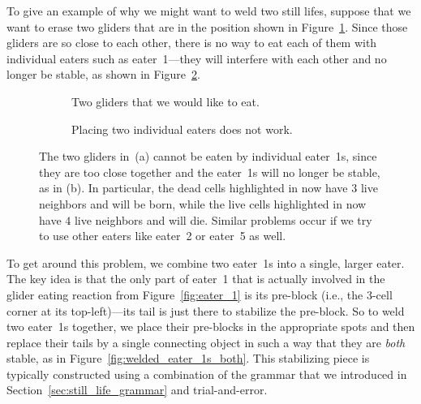 To give an example of why we might want to weld two still lifes, suppose that we want to erase two gliders that are in the position shown in Figure~\ref{fig:unstable_eater_1s_a}. Since those gliders are so close to each other, there is no way to eat each of them with individual eaters such as eater~1---they will interfere with each other and no longer be stable, as shown in Figure~\ref{fig:unstable_eater_1s_b}.

\begin{figure}[!htb]
	\centering
	\begin{subfigure}{.47\textwidth}
		\centering
		\caption{Two gliders that we would like to eat.}
		\label{fig:unstable_eater_1s_a}
	\end{subfigure} \quad %
	\begin{subfigure}{.47\textwidth}
		\centering
		\caption{Placing two individual eaters does not work.}
		\label{fig:unstable_eater_1s_b}
	\end{subfigure}
	\caption{The two gliders in~(a) cannot be eaten by individual eater~1s, since they are too close together and the eater~1s will no longer be stable, as in (b). In particular, the dead cells highlighted in  now have $3$ live neighbors and will be born, while the live cells highlighted in  now have $4$ live neighbors and will die. Similar problems occur if we try to use other eaters like eater~2 or eater~5 as well.}\label{fig:unstable_eater_1s}
\end{figure}

To get around this problem, we combine two eater~1s into a single, larger eater. The key idea is that the only part of eater~1 that is actually involved in the glider eating reaction from Figure~\ref{fig:eater_1} is its pre-block (i.e., the $3$-cell corner at its top-left)---its tail is just there to stabilize the pre-block. So to weld two eater~1s together, we place their pre-blocks in the appropriate spots and then replace their tails by a single connecting object in such a way that they are \emph{both} stable, as in Figure~\ref{fig:welded_eater_1s_both}. This stabilizing piece is typically constructed using a combination of the grammar that we introduced in Section~\ref{sec:still_life_grammar} and trial-and-error.


